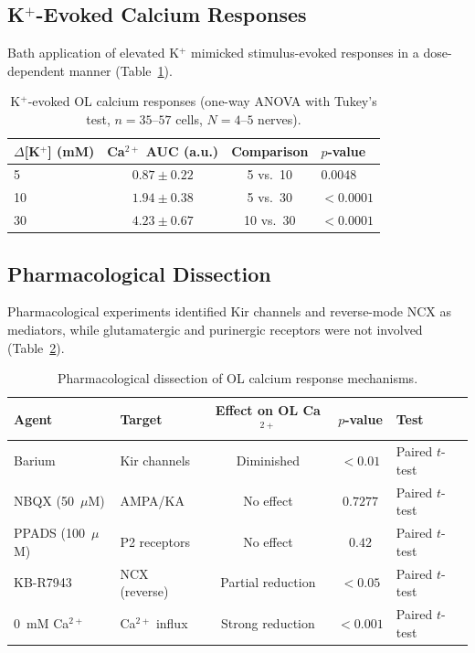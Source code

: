 \documentclass[11pt]{article}
\begin{document}
\subsection{K$^+$-Evoked Calcium Responses}

Bath application of elevated K$^+$ mimicked stimulus-evoked responses in a dose-dependent manner (Table~\ref{tab:potassium}).

\begin{table}[H]
\centering
\caption{K$^+$-evoked OL calcium responses (one-way ANOVA with Tukey's test, $n = 35$--$57$ cells, $N = 4$--$5$ nerves).}
\label{tab:potassium}
\begin{tabular}{@{}lccl@{}}
\toprule
$\Delta$[K$^+$] (mM) & Ca$^{2+}$ AUC (a.u.) & Comparison & $p$-value \\
\midrule
5 & $0.87 \pm 0.22$ & 5 vs.\ 10 & $\mathbf{0.0048}$ \\
10 & $1.94 \pm 0.38$ & 5 vs.\ 30 & $\mathbf{< 0.0001}$ \\
30 & $4.23 \pm 0.67$ & 10 vs.\ 30 & $\mathbf{< 0.0001}$ \\
\bottomrule
\end{tabular}
\end{table}

\subsection{Pharmacological Dissection}

Pharmacological experiments identified Kir channels and reverse-mode NCX as mediators, while glutamatergic and purinergic receptors were not involved (Table~\ref{tab:pharma}).

\begin{table}[H]
\centering
\caption{Pharmacological dissection of OL calcium response mechanisms.}
\label{tab:pharma}
\begin{tabular}{@{}llccl@{}}
\toprule
Agent & Target & Effect on OL Ca$^{2+}$ & $p$-value & Test \\
\midrule
Barium & Kir channels & Diminished & $< 0.01$ & Paired $t$-test \\
NBQX (50~$\mu$M) & AMPA/KA & No effect & $0.7277$ & Paired $t$-test \\
PPADS (100~$\mu$M) & P2 receptors & No effect & $0.42$ & Paired $t$-test \\
KB-R7943 & NCX (reverse) & Partial reduction & $< 0.05$ & Paired $t$-test \\
0~mM Ca$^{2+}$ & Ca$^{2+}$ influx & Strong reduction & $< 0.001$ & Paired $t$-test \\
\bottomrule
\end{tabular}
\end{table}
\end{document}
